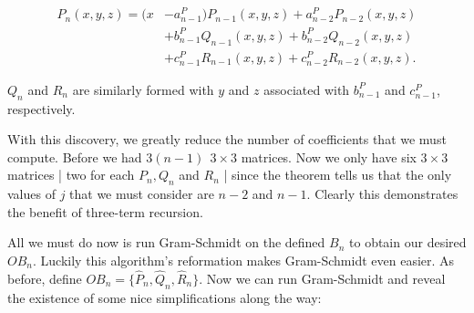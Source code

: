 \documentclass[letterpaper, 12pt]{article}
\begin{document}
\vspace*{-12mm}
\begin{align*}
	P_n(x,y,z) = (x&-a_{n-1}^P)P_{n-1}(x,y,z) + a_{n-2}^PP_{n-2}(x,y,z) \\
				&+ b_{n-1}^PQ_{n-1}(x,y,z) + b_{n-2}^PQ_{n-2}(x,y,z) \\
				&+ c_{n-1}^PR_{n-1}(x,y,z) + c_{n-2}^PR_{n-2}(x,y,z).
\end{align*}

\vspace*{-3mm}
\noindent $Q_n$ and $R_n$ are similarly formed with $y$ and $z$ associated with $b_{n-1}^P$ and $c_{n-1}^P$, respectively.

With this discovery, we greatly reduce the number of coefficients that we must compute. Before we had $3(n-1) \ \ 3\times 3$ matrices. Now we only have six $3\times 3$ matrices | two for each $P_n, Q_n$ and $R_n$ | since the theorem tells us that the only values of $j$ that we must consider are $n-2$ and $n-1$. Clearly this demonstrates the benefit of three-term recursion.

All we must do now is run Gram-Schmidt on the defined $B_n$ to obtain our desired $OB_n$. Luckily this algorithm's reformation makes Gram-Schmidt even easier. As before, define $OB_n = \{\hat{P}_n, \hat{Q}_n, \hat{R}_n\}$. Now we can run Gram-Schmidt and reveal the existence of some nice simplifications along the way:
\end{document}
